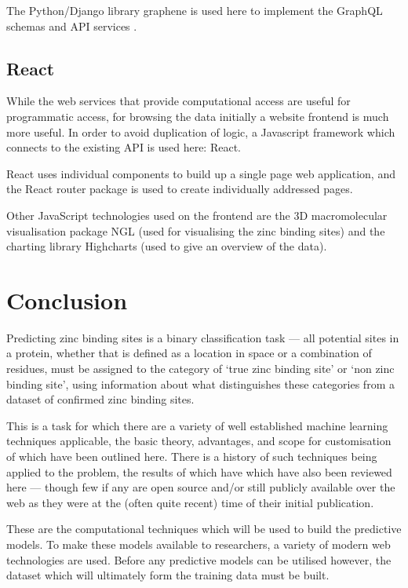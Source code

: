 The Python/Django library graphene is used here to implement the GraphQL schemas and API services \cite{graphene}.

\subsection{React}

While the web services that provide computational access are useful for programmatic access, for browsing the data initially a website frontend is much more useful. In order to avoid duplication of logic, a Javascript framework which connects to the existing API is used here: React.

React uses individual components to build up a single page web application, and the React router package is used to create individually addressed pages.

Other JavaScript technologies used on the frontend are the 3D macromolecular visualisation package NGL (used for visualising the zinc binding sites) \cite{rose2015ngl} and the charting library Highcharts (used to give an overview of the data).

\section{Conclusion}

Predicting zinc binding sites is a binary classification task --- all potential sites in a protein, whether that is defined as a location in space or a combination of residues, must be assigned to the category of `true zinc binding site' or `non zinc binding site', using information about what distinguishes these categories from a dataset of confirmed zinc binding sites.

This is a task for which there are a variety of well established machine learning techniques applicable, the basic theory, advantages, and scope for customisation of which have been outlined here. There is a history of such techniques being applied to the problem, the results of which have which have also been reviewed here --- though few if any are open source and/or still publicly available over the web as they were at the (often quite recent) time of their initial publication.

These are the computational techniques which will be used to build the predictive models. To make these models available to researchers, a variety of modern web technologies are used. Before any predictive models can be utilised however, the dataset which will ultimately form the training data must be built.